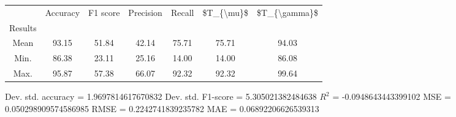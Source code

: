 \begin{tabular}{|c|c|c|c|c|c|c|}
\toprule
{} &  Accuracy &  F1 score &  Precision &  Recall &  \$T\_\{\textbackslash mu\}\$ &  \$T\_\{\textbackslash gamma\}\$ \\
Results &           &           &            &         &            &               \\
\hline
Mean    &     93.15 &     51.84 &      42.14 &   75.71 &      75.71 &         94.03 \\
Min.    &     86.38 &     23.11 &      25.16 &   14.00 &      14.00 &         86.08 \\
Max.    &     95.87 &     57.38 &      66.07 &   92.32 &      92.32 &         99.64 \\
\bottomrule
\end{tabular}

 Dev. std. accuracy = 1.9697814617670832
 Dev. std. F1-score = 5.305021382484638
 $R^2$ = -0.0948643443399102
 MSE = 0.050298909574586985
 RMSE = 0.2242741839235782
 MAE = 0.06892206626539313